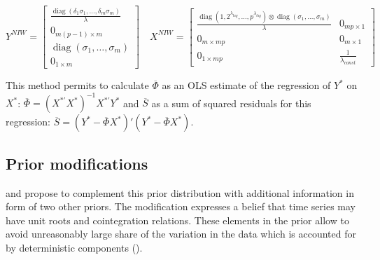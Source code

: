 \documentclass[11pt]{article} %
\DeclareMathOperator{\diag}{diag}
\newcommand{\post}{\overline}
\begin{document}
\begin{equation}
Y^{NIW}=\begin{bmatrix}
\frac{\diag(\delta_1\sigma_1,\ldots, \delta_m\sigma_m)}{\lambda}\\
0_{m(p-1)\times m}\\
\diag(\sigma_1,\ldots,\sigma_m)\\
0_{1\times m}
\end{bmatrix}
\quad
%
X^{NIW}=\begin{bmatrix}
\frac{\diag(1,2^{\lambda_{lag}},\ldots, p^{\lambda_{lag}})\otimes \diag(\sigma_1,\ldots,\sigma_m)}{\lambda} & 0_{mp\times 1} \\
0_{m\times mp}&0_{m\times 1}\\
0_{1\times mp}&\frac{1}{\lambda_{const}}
\end{bmatrix}\label{NIW_observations}
\end{equation}

This method permits to calculate $\post \Phi$ as an OLS estimate of the regression of $Y^*$ on $X^*$: $\post \Phi=(X^{*\prime}X^*)^{-1} X^{*\prime}Y^*$ and $\post S$ as a sum of squared residuals for this regression: 
$\post S =(Y^* - \post \Phi X^*)'(Y^* - \post \Phi X^*)$.



\subsection{Prior modifications}

\cite{doan_al_1984} and \cite{sims_1993} propose to complement this prior distribution with additional information in form of two other priors. The modification expresses a belief that time series may have unit roots and cointegration relations. These elements in the prior allow to avoid unreasonably large share of the variation in the data which is accounted for by deterministic components (\cite{sims_1993}).
\end{document}
